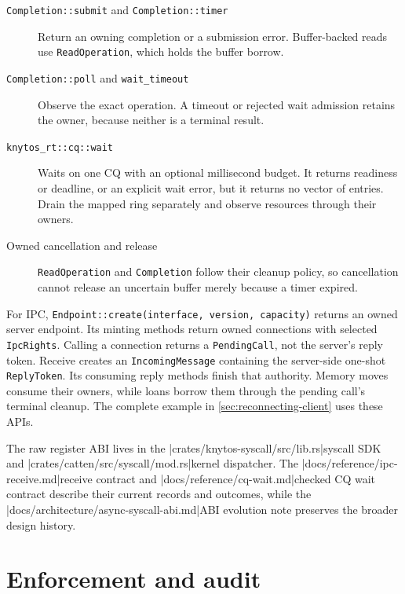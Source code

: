 \begin{description}
    \item[\texttt{Completion::submit} and \texttt{Completion::timer}]
        Return an owning completion or a submission error. Buffer-backed reads
        use \texttt{ReadOperation}, which holds the buffer borrow.
    \item[\texttt{Completion::poll} and \texttt{wait\_timeout}]
        Observe the exact operation. A timeout or rejected wait admission retains
        the owner, because neither is a terminal result.
    \item[\texttt{knytos\_rt::cq::wait}]
        Waits on one CQ with an optional millisecond budget. It returns readiness
        or deadline, or an explicit wait error, but it returns no vector of entries.
        Drain the mapped ring separately and observe resources through their owners.
    \item[Owned cancellation and release]
        \texttt{ReadOperation} and \texttt{Completion} follow their cleanup policy, so
        cancellation cannot release an uncertain buffer merely because a timer expired.
\end{description}

For IPC, \texttt{Endpoint::create(interface, version, capacity)} returns an owned
server endpoint. Its minting methods return owned connections with selected
\texttt{IpcRights}. Calling a connection returns a \texttt{PendingCall}, not
the server's reply token. Receive creates an \texttt{IncomingMessage} containing
the server-side one-shot \texttt{ReplyToken}. Its consuming reply methods finish
that authority. Memory moves consume their owners, while loans borrow them through the
pending call's terminal cleanup. The complete example in
\autoref{sec:reconnecting-client} uses these APIs.

The raw register ABI lives in the
\repofiletext|crates/knytos-syscall/src/lib.rs|{syscall SDK} and
\repofiletext|crates/catten/src/syscall/mod.rs|{kernel dispatcher}. The
\repofiletext|docs/reference/ipc-receive.md|{receive contract} and
\repofiletext|docs/reference/cq-wait.md|{checked CQ wait contract} describe their
current records and outcomes, while the
\repofiletext|docs/architecture/async-syscall-abi.md|{ABI evolution note} preserves
the broader design history.

\section{Enforcement and audit}

